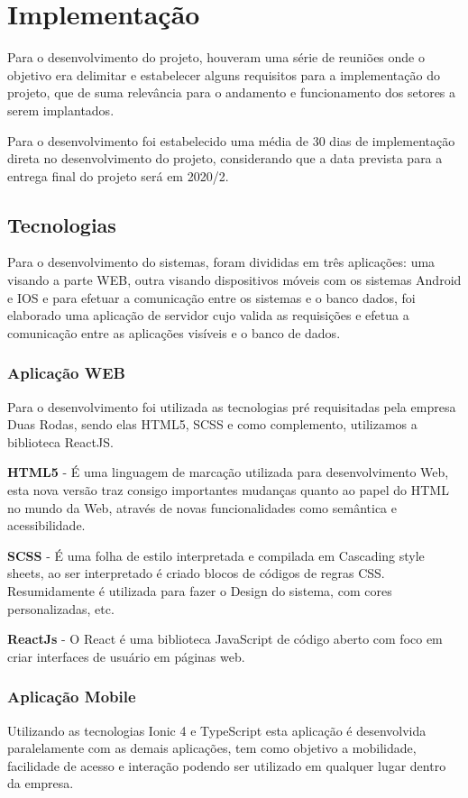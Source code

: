 \chapter{Implementação}
Para o desenvolvimento do projeto, houveram uma série de reuniões onde o objetivo era delimitar e estabelecer alguns requisitos para a implementação do projeto, que de suma relevância para o andamento e funcionamento dos setores a serem implantados.

Para o desenvolvimento foi estabelecido uma média de 30 dias de implementação direta no desenvolvimento do projeto, considerando que a data prevista para a entrega final do projeto será em 2020/2.

\section{Tecnologias}
Para o desenvolvimento do sistemas, foram divididas em três aplicações: uma visando a parte WEB, outra visando dispositivos móveis com os sistemas Android e IOS e para efetuar a comunicação entre os sistemas e o banco dados, foi elaborado uma aplicação de servidor cujo valida as requisições e efetua a comunicação entre as aplicações visíveis e o banco de dados.

\subsection{Aplicação WEB}

Para o desenvolvimento foi utilizada as tecnologias pré requisitadas pela empresa Duas Rodas, sendo elas HTML5, SCSS e como complemento, utilizamos a biblioteca ReactJS.



{\textbf{HTML5} - É uma linguagem de marcação utilizada para desenvolvimento Web, esta nova versão traz consigo importantes mudanças quanto ao papel do HTML no mundo da Web, através de novas funcionalidades como semântica e acessibilidade.}

{\textbf{SCSS} - É uma folha de estilo interpretada e compilada em Cascading style sheets, ao ser interpretado é criado blocos de códigos de regras CSS. Resumidamente é utilizada para fazer o Design do sistema, com cores personalizadas, etc.}

{\textbf{ReactJs} - O React é uma biblioteca JavaScript de código aberto com foco em criar interfaces de usuário em páginas web.}

\subsection{Aplicação Mobile}
Utilizando as tecnologias Ionic 4 e TypeScript esta aplicação é desenvolvida paralelamente com as demais aplicações, tem como objetivo a mobilidade, facilidade de acesso e interação podendo ser utilizado em qualquer lugar dentro da empresa.

